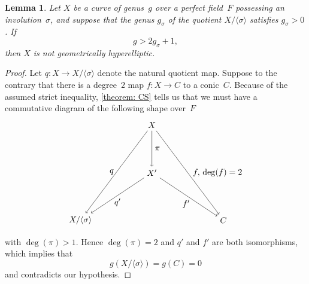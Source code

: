 \documentclass[10pt,a4paper]{amsart}
\newtheorem{lemma}{Lemma}
\newcommand{\Pietro}[1]{{\color{orange}{??Pietro: #1}}} %
\newcommand{\freddy}[1]{{\color{purple}{$\spadesuit$ Freddy: #1}}}
\begin{document}
\begin{lemma}\label{lemma: CS_geom_hyperelliptic_bound}
Let $X$ be a curve of genus~$g$ over a perfect field~$F$ possessing an involution~$\sigma$, %
and suppose that the genus $g_\sigma$ of the quotient $X/\langle \sigma \rangle$ satisfies $g_\sigma > 0$. If
\[
g > 2g_\sigma + 1,
\]
then $X$ is not geometrically hyperelliptic. 
\end{lemma}

\begin{proof}
Let $q\colon X \to X/\langle \sigma \rangle$ denote the natural quotient map. Suppose to the contrary that there is a degree~$2$ map $f\colon X \to C$ to a conic~$C$. Because of the assumed strict inequality, \cref{theorem: CS} tells us that we must have a commutative diagram of the following shape over~$F$
\[
\begin{tikzpicture}[node distance=2.2cm]
\node (X) at (0,2) {$X$};
\node (Xp) at (0,0) {$X'$};
\node (Q) at (-3,-2) {$X/\langle \sigma \rangle$};
\node (C) at (3,-2) {$C$};

\draw[->] (X) -- node[right] {$\pi$} (Xp);
\draw[->] (X) -- node[left] {$q$} (Q);
\draw[->] (X) -- node[right] {$\;f,\, \deg(f) = 2$} (C);
\draw[->] (Xp) -- node[below] {$q'$} (Q);
\draw[->] (Xp) -- node[below] {$f'\;\;$} (C);
\end{tikzpicture}
\]
with $\deg(\pi) > 1$. Hence $\deg(\pi) = 2$ and $q'$ and $f'$ are both isomorphisms, which implies that 
\[ g\left(X/\langle \sigma \rangle\right) = g(C) = 0 \]
and contradicts our hypothesis. %
\end{proof}
\end{document}
